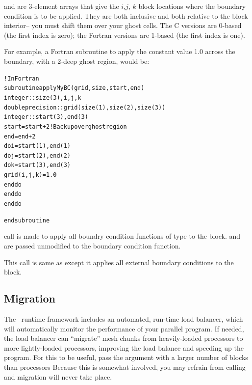 \documentclass[10pt]{article}
\begin{document}
 and  are 3-element arrays that give the $i$,$j$, $k$ 
block locations where the boundary condition
is to be applied.  They are both inclusive and both relative to the 
block interior-- you must shift them over your ghost cells.  The C versions
are 0-based (the first index is zero); the Fortran versions are 1-based
(the first index is one).  

For example, a Fortran subroutine to apply the constant value 1.0 across the
boundary, with a 2-deep ghost region, would be:

\begin{alltt}
	!In Fortran
	subroutine applyMyBC(grid,size,start,end)
	integer :: size(3), i,j,k
	double precision :: grid(size(1),size(2),size(3))
	integer :: start(3), end(3)
	start=start+2 ! Back up over ghost region
	end=end+2
	do i=start(1),end(1)
	do j=start(2),end(2)
	do k=start(3),end(3)
	    grid(i,j,k)=1.0
	end do
	end do
	end do

	end subroutine	
\end{alltt}


\vspace{0.2in}
 call is made to apply all boundry condition functions
of type  to the block.   and  are passed unmodified
to the boundary condition function.

\vspace{0.2in}
This call is same as  except it applies all 
external boundary conditions to the block.


\subsection{Migration}

The \charmpp\ runtime framework includes an automated, run-time load balancer,
which will automatically monitor the performance of your parallel program.
If needed, the load balancer can ``migrate'' mesh chunks from heavily-loaded
processors to more lightly-loaded processors, improving the load balance and
speeding up the program.  For this to be useful, pass the  argument
with a larger number of blocks  than processors
Because this is somewhat involved, you may refrain from calling 
 and migration will never take place.
\end{document}
